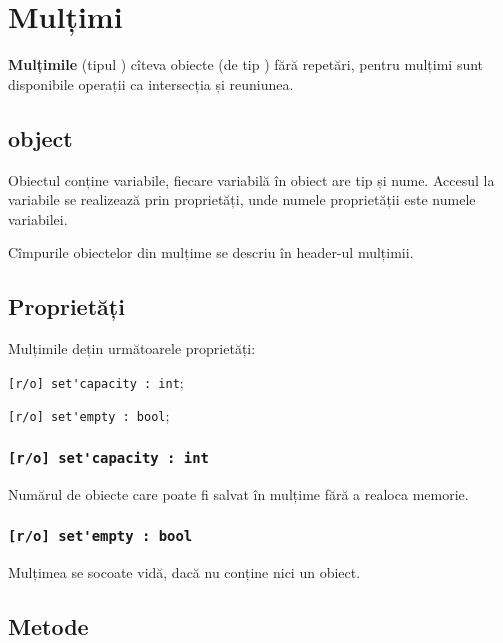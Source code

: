 \section{Mulțimi}

{\bf Mulțimile} (tipul \set) cîteva obiecte (de tip \object) fără repetări, pentru mulțimi sunt disponibile operații ca intersecția și reuniunea.

\subsection{{\color{lightblue} object}}

Obiectul conține variabile, fiecare variabilă în obiect are tip și nume. Accesul la variabile se realizează prin proprietăți, unde numele proprietății este numele variabilei.

Cîmpurile obiectelor din mulțime se descriu în header-ul mulțimii.

\subsection{Proprietăți}

Mulțimile dețin următoarele proprietăți:
\begin{icItems}
\item \lstinline|[r/o] set'capacity : int|;
\item \lstinline|[r/o] set'empty : bool|;
\end{icItems}

\subsubsection{\lstinline|[r/o] set'capacity : int|}

Numărul de obiecte care poate fi salvat în mulțime fără a realoca memorie.

\subsubsection{\lstinline|[r/o] set'empty : bool|}

Mulțimea se socoate vidă, dacă nu conține nici un obiect.

\subsection{Metode}

